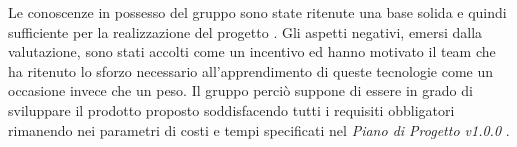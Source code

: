 Le conoscenze in possesso del gruppo \GRUPPO{} sono state ritenute una base solida e quindi sufficiente per la realizzazione del progetto \PROGETTO.
Gli aspetti negativi, emersi dalla valutazione, sono stati accolti come un incentivo ed hanno motivato il team che ha ritenuto lo sforzo necessario all'apprendimento di queste tecnologie come un occasione invece che un peso.
Il gruppo perciò suppone di essere in grado di sviluppare il prodotto proposto soddisfacendo tutti i requisiti obbligatori rimanendo nei parametri di costi e tempi specificati nel \textit{Piano di Progetto v1.0.0} .
